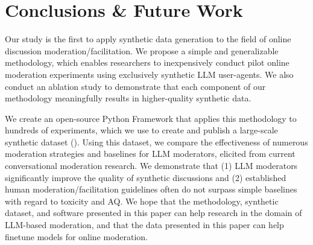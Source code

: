 %
\section{Conclusions \& Future Work}

Our study is the first to apply synthetic data generation to the field of online discussion moderation/facilitation. We propose a simple and generalizable methodology, which enables researchers to inexpensively conduct pilot online moderation experiments using exclusively synthetic \ac{LLM} user-agents. We also conduct an ablation study to demonstrate that each component of our methodology meaningfully results in higher-quality synthetic data.

We create an open-source Python Framework \syndisco that applies this methodology to hundreds of experiments, which we use to create and publish a large-scale synthetic dataset (\vmd). Using this dataset, we compare the effectiveness of numerous moderation strategies and baselines  for \ac{LLM} moderators, elicited from current conversational moderation research. We demonstrate that (1) \ac{LLM} moderators significantly improve the quality of synthetic discussions and (2) established human moderation/facilitation guidelines often do not surpass simple baselines with regard to toxicity and \ac{AQ}. We hope that the methodology, synthetic dataset, and software presented in this paper can help research in the domain of \ac{LLM}-based moderation, and that the data presented in this paper can help finetune models for online moderation.
